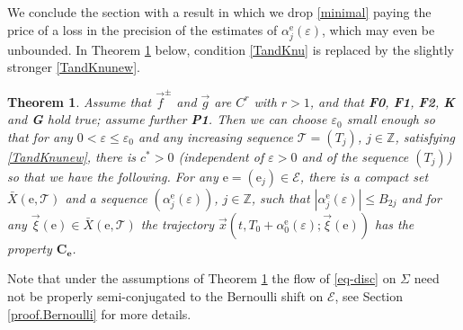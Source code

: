\documentclass[10pt]{article}
\numberwithin{equation}{section}
\def\al{\alpha}
\def\ep{\varepsilon}
\def\Z{{\mathbb Z}}
\def\ee{{\mathrm e}}
\def\EE{{\mathcal E}}
\def\xxi{\vec{\xi}}
\def\x{\vec{x}}
\def\f{\vec{f}}
\def\g{\vec{g}}
\newcommand\assump[1]{{\rm\textbf{#1}}}
\newtheorem{theorem}{Theorem}[section]
\theoremstyle{definition}
\theoremstyle{remark}
\begin{document}
 We conclude the section with a result in which we drop \eqref{minimal} paying the price
of a loss in the precision of the estimates of $\alpha_j^{\ee}(\ep)$, which may even be unbounded.
In Theorem \ref{veryweak} below, condition \eqref{TandKnu} is replaced by the slightly stronger
 \eqref{TandKnunew}.


\begin{theorem}\label{veryweak}
	Assume that   $\f^{\pm}$ and $\g$ are $C^r$ with  $r > 1$,   and that \assump{F0}, \assump{F1}, \assump{F2}, \assump{K} and \assump{G} hold true;
assume further    \assump{P1}.
Then we can choose $\ep_0$ small enough so that for any $0< \ep \le \ep_0$
and any increasing sequence $\mathcal{T}=(T_j)$, $j \in \Z$,  satisfying  \eqref{TandKnunew},
 there is $c^*>0$ (independent of $\ep>0$ and  of the sequence $(T_j)$)
so that we have the following.
For any $\ee=(\ee_j) \in \EE$,
there is a compact set $\bar{X}(\ee, \mathcal{T})$ and a sequence $(\al_j^{\ee}(\ep))$, $j \in \Z$,
such that $|\al_j^{\ee}(\ep)| \le B_{2j}$ and for any $\xxi(\ee) \in \bar{X}(\ee, \mathcal{T})$
  the trajectory $\x(t,T_0+ \al_0^{\ee}(\ep); \xxi(\ee))$ has the property
  $\mathbf{C_e}$.
\end{theorem}

Note that under the assumptions of Theorem \ref{veryweak} the flow of \eqref{eq-disc} on $\Sigma$ need not be properly semi-conjugated to the Bernoulli shift on $\EE$, see
Section \ref{proof.Bernoulli} for more details.
\end{document}
